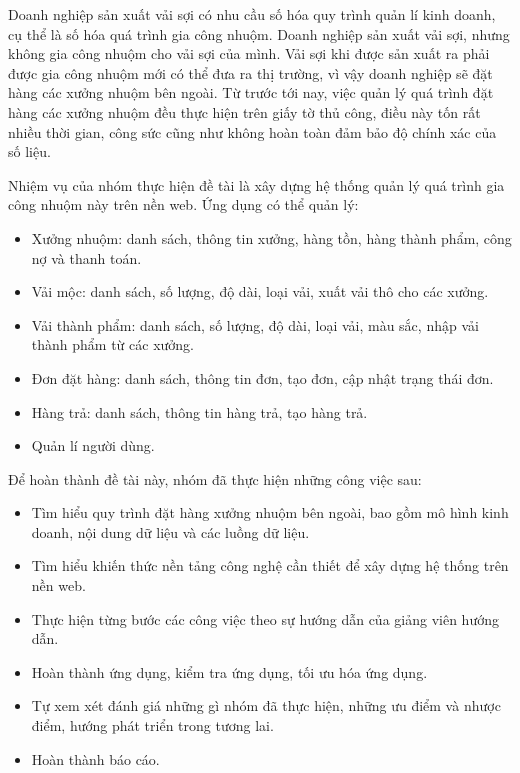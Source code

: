 Doanh nghiệp sản xuất vải sợi có nhu cầu số hóa quy trình quản lí kinh doanh, cụ thể là số hóa quá trình gia công nhuộm. Doanh nghiệp sản xuất vải sợi, nhưng không gia công nhuộm cho vải sợi của mình. Vải sợi khi được sản xuất ra phải được gia công nhuộm mới có thể đưa ra thị trường, vì vậy doanh nghiệp sẽ đặt hàng các xưởng nhuộm bên ngoài. Từ trước tới nay, việc quản lý quá trình đặt hàng các xưởng nhuộm đều thực hiện trên giấy tờ thủ công, điều này tốn rất nhiều thời gian, công sức cũng như không hoàn toàn đảm bảo độ chính xác của số liệu.\par
Nhiệm vụ của nhóm thực hiện đề tài là xây dựng hệ thống quản lý quá trình gia công nhuộm này trên nền web. Ứng dụng có thể quản lý:
\begin{itemize}
    \item Xưởng nhuộm: danh sách, thông tin xưởng, hàng tồn, hàng thành phẩm, công nợ và thanh toán.
    \item Vải mộc: danh sách, số lượng, độ dài, loại vải, xuất vải thô cho các xưởng.
    \item Vải thành phẩm: danh sách, số lượng, độ dài, loại vải, màu sắc, nhập vải thành phẩm từ các xưởng.
    \item Đơn đặt hàng: danh sách, thông tin đơn, tạo đơn, cập nhật trạng thái đơn.
    \item Hàng trả: danh sách, thông tin hàng trả, tạo hàng trả.
    \item Quản lí người dùng.
\end{itemize}
Để hoàn thành đề tài này, nhóm đã thực hiện những công việc sau:
\begin{itemize}
    \item Tìm hiểu quy trình đặt hàng xưởng nhuộm bên ngoài, bao gồm mô hình kinh doanh, nội dung dữ liệu và các luồng dữ liệu.
    \item Tìm hiểu khiến thức nền tảng công nghệ cần thiết để xây dựng hệ thống trên nền web.
    \item Thực hiện từng bước các công việc theo sự hướng dẫn của giảng viên hướng dẫn.
    \item Hoàn thành ứng dụng, kiểm tra ứng dụng, tối ưu hóa ứng dụng.
    \item Tự xem xét đánh giá những gì nhóm đã thực hiện, những ưu điểm và nhược điểm, hướng phát triển trong tương lai.
    \item Hoàn thành báo cáo.
\end{itemize}
